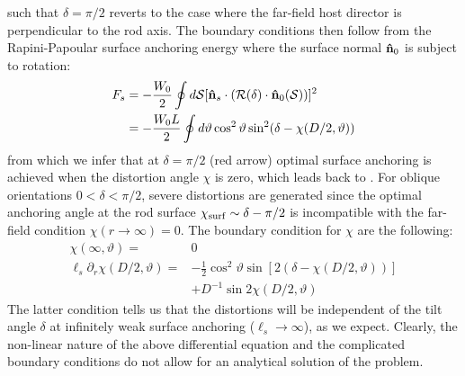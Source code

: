 \eeq
such that $\delta = \pi/2$ reverts to the case where the far-field host  director is perpendicular to the rod axis. The boundary conditions then follow from the Rapini-Papoular surface anchoring energy where the surface normal ${\bf \hat{n}}_{0}$ is subject to rotation:
\begin{align}
F_{s} &= -\frac{W_{0}}{2} \oint d{\mathcal S}  [{\bf \hat{n}}_{s} \cdot  (\mathcal{R} ( \delta ) \cdot  {\bf \hat{n}}_{0}({\mathcal S}))]^{2} \nonumber \\
& = -\frac{  W_{0} L}{2 } \oint d \vartheta \cos^{2} \vartheta \sin^{2}(\delta - \chi(D/2, \vartheta))
\label{raporot}
\end{align}
from which we infer that at $\delta = \pi/2$ (red arrow) optimal surface anchoring is achieved  when the  distortion angle $\chi $ is zero, which leads back to . For oblique orientations $0<\delta < \pi/2$, severe distortions are generated since the optimal anchoring angle at the rod surface $\chi_{\rm surf} \sim \delta - \pi/2$ is incompatible with the far-field condition $\chi(r \rightarrow \infty) =0$.
The boundary condition for $\chi$ are the following:
\begin{align}
\chi(  \infty, \vartheta ) = & 0 \nonumber \\
\ell_{s} \partial_{r} \chi(D/2, \vartheta ) = & - \frac{1}{2 } \cos^{2} \vartheta \sin [2(\delta - \chi(D/2, \vartheta))] \nonumber \\
& + D^{-1} \sin 2 \chi(D/2, \vartheta)
\end{align}
The latter condition tells us that the distortions will be independent of the tilt angle $\delta$ at infinitely weak surface anchoring ($\ell_{s} \rightarrow \infty$), as we expect.
Clearly, the non-linear nature of the above differential equation and the complicated boundary conditions do not allow for an analytical solution of the problem.


